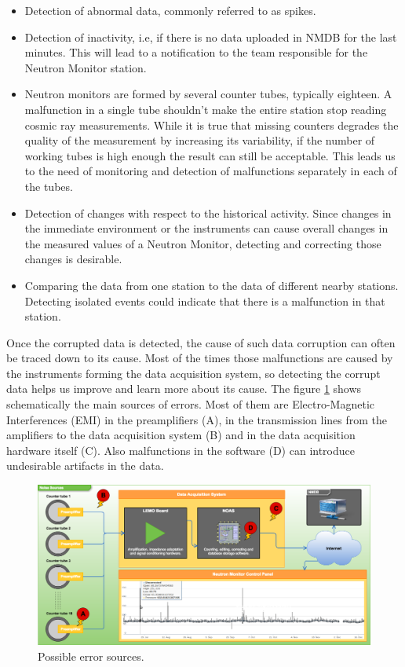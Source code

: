 \documentclass[a4paper]{jpconf}
\begin{document}
\begin{itemize}
	\item Detection of abnormal data, commonly referred to as spikes.
    \item Detection of inactivity, i.e, if there is no data uploaded in NMDB for
        the last minutes. This will lead to a notification to the team
        responsible for the Neutron Monitor station. 
    \item Neutron monitors are formed by several counter tubes, typically
        eighteen. A malfunction in a single tube shouldn't make the entire
        station stop reading cosmic ray measurements. While it is true that
        missing counters degrades the quality of the measurement by increasing its
        variability, if the number of working tubes is high enough the result can
        still be acceptable. This leads us to the need of monitoring and
        detection of malfunctions separately in each of the tubes.  
    \item Detection of changes with respect to the historical activity.
        Since changes in the immediate environment or the instruments can cause
        overall changes in the measured values of a Neutron Monitor, detecting
        and correcting those changes is desirable.
    \item Comparing the data from one station to the data of different nearby
        stations. Detecting isolated events could indicate that there is a
        malfunction in that station.	
\end{itemize}

Once the corrupted data is detected, the cause of such data corruption can
often be traced down to its cause. Most of the times those malfunctions are
caused by the instruments forming the data acquisition system, so detecting the
corrupt data helps us improve and learn more about its cause. The figure
\ref{fig:NoisePoints} shows schematically the main sources of errors. Most of
them are Electro-Magnetic Interferences (EMI) in the preamplifiers (A), in the
transmission lines from the amplifiers to the data acquisition system (B) and in
the data acquisition hardware itself (C). Also malfunctions in the software (D)
can introduce undesirable artifacts in the data.

\begin{figure}[ht]
    \centering
    \includegraphics[keepaspectratio, width=1\textwidth]{./resources/NoisePoints.png}
    \caption{Possible error sources.}
    \label{fig:NoisePoints}
\end{figure}
\end{document}
